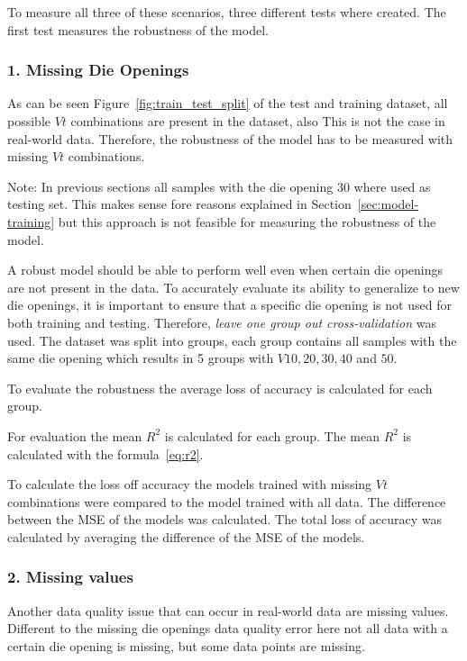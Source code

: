 To measure all three of these scenarios, three different tests where created. The first test
measures the robustness of the model.

\subsubsection*{1. Missing Die Openings}
As can be seen Figure~\ref{fig:train_test_split} of the test and training dataset, all possible
$Vt$ combinations are present in the dataset, also
This is not the case in real-world data. Therefore, the robustness of the model has to be
measured with missing $Vt$ combinations.

Note: In previous sections all samples with the die opening 30 where used as testing set. This
makes sense fore reasons explained in Section~\ref{sec:model-training} but this approach is not
feasible for measuring the robustness of the model.

A robust model should be able to perform well even when certain die openings are not present in
the data. To accurately evaluate its ability to generalize to new die openings, it is important
to ensure that a specific die opening is not used for both training and testing.
Therefore, \textit{leave one group out cross-validation} was used.
The dataset was split into groups, each group contains all samples with the same die opening
which results in 5 groups with $V 10, 20, 30, 40$ and $50$.

To evaluate the robustness the average loss of accuracy is calculated for each group.

For evaluation the mean $R^2$ is calculated for each group. The mean $R^2$ is calculated with the
formula~\ref{eq:r2}.


To calculate the loss off accuracy the models trained with missing $Vt$ combinations were
compared to the model trained with all data.
The difference between the \ac{MSE} of the models was calculated. The total loss of accuracy was
calculated by averaging the difference of the \ac{MSE} of the models.

\subsubsection*{2. Missing values}
Another data quality issue that can occur in real-world data are missing values.
Different to the missing die openings data quality error here not all data with a certain die
opening is missing, but some data points are missing.


